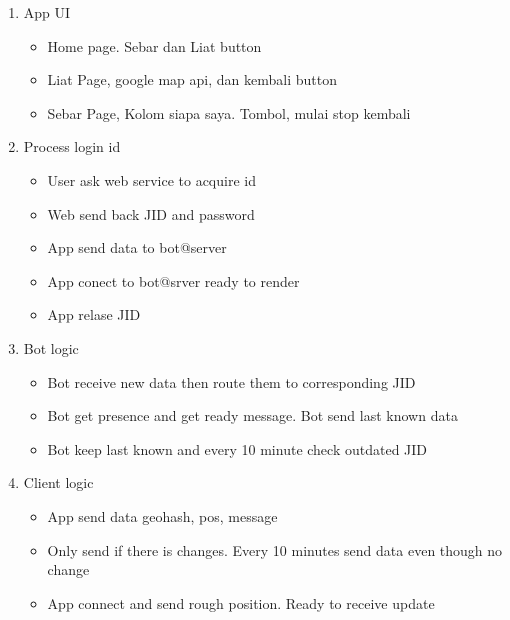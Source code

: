 \documentclass{article}
\begin{document}
\begin{enumerate}
\item App UI
\begin{itemize}
    \item Home page. Sebar dan Liat button
    \item Liat Page, google map api, dan kembali button
    \item Sebar Page, Kolom siapa saya. Tombol, mulai stop kembali
\end{itemize}

\item Process login id
\begin{itemize}
    \item User ask web service to acquire id
    \item Web send back JID and password
    \item App send data to bot@server
    \item App conect to bot@srver ready to render
    \item App relase JID
\end{itemize}

\item Bot logic
\begin{itemize}
    \item Bot receive new data then route them to corresponding JID
    \item Bot get presence and get ready message. Bot send last known data
    \item Bot keep last known and every 10 minute check outdated JID
\end{itemize}

\item Client logic
\begin{itemize}
    \item App send data geohash, pos, message
    \item Only send if there is changes. Every 10 minutes send data even though no change
    \item App connect and send rough position. Ready to receive update
\end{itemize}

\end{enumerate}
\end{document}
